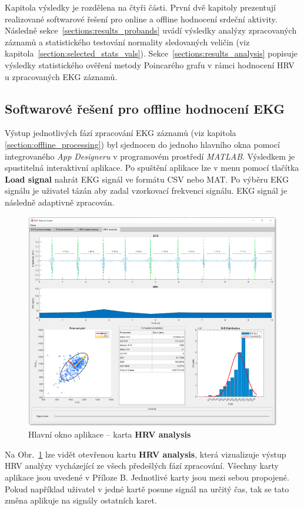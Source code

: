 Kapitola výsledky je rozdělena na čtyři části. První dvě kapitoly prezentují
realizované softwarové řešení pro online a offline hodnocení srdeční aktivity.
Následně sekce~\ref{sections:results_probands} uvádí výsledky analýzy
zpracovaných záznamů a statistického testování normality sledovaných veličin
(viz kapitola~\ref{section:selected_stats_vals}).
Sekce~\ref{sections:results_analysis} popisuje výsledky statistického ověření
metody Poincarého grafu v rámci hodnocení HRV u zpracovaných EKG záznamů.

\subsection{Softwarové řešení pro offline hodnocení EKG}
\label{sections:results_online}
Výstup jednotlivých fází zpracování EKG záznamů (viz kapitola
\ref{section:offline_processing}) byl sjednocen do jednoho hlavního okna pomocí
integrovaného \textit{App Designeru} \cite{matlabAPPDESIGNER} v programovém
prostředí \textit{MATLAB}. Výsledkem je spustitelná interaktivní aplikace. Po
spuštění aplikace lze v menu pomocí tlačítka \textbf{Load signal} nahrát EKG
signál ve formátu CSV nebo MAT. Po výběru EKG signálu je uživatel tázán aby
zadal vzorkovací frekvenci signálu. EKG signál je následně adaptivně zpracován.
\begin{figure}[h]
	\begin{center}
		\includegraphics[width=1\textwidth]{../assets/matlab_EDA/tab4}
		\caption{Hlavní okno aplikace -- karta \textbf{HRV analysis}}
		\label{fig:results_matlab_tab4}
	\end{center}
\end{figure}
Na Obr.~\ref{fig:results_matlab_tab4} lze vidět otevřenou kartu \textbf{HRV
analysis}, která vizualizuje výstup HRV analýzy vycházející ze všech předešlých
fází zpracování. Všechny karty aplikace jsou uvedené v Příloze B. Jednotlivé
karty jsou mezi sebou propojené. Pokud například uživatel v jedné kartě posune
signál na určitý čas, tak se tato změna aplikuje na signály ostatních karet.

